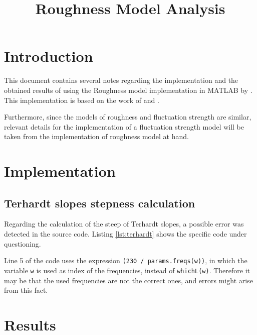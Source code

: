 \documentclass[a4paper]{article}
\begin{document}
\title{\citeauthor{Schrader2002Matlab} Roughness Model Analysis}

\maketitle

\section{Introduction} 

This document contains several notes regarding the implementation and the
obtained results of using the Roughness model implementation in MATLAB by
\citet{Schrader2002Matlab}. This implementation is based on the work of
\citet{Aures1985Ein} and \citet{Daniel1997Psychoacoustical}.

Furthermore, since the models of roughness and fluctuation strength are similar,
relevant details for the implementation of a fluctuation strength model will be
taken from the implementation of roughness model at hand.

\section{Implementation}

\subsection{Terhardt slopes stepness calculation}

Regarding the calculation of the steep of Terhardt slopes, a possible error was
detected in the source code. Listing \ref{lst:terhardt} shows the specific code
under questioning.



Line 5 of the code uses the expression
\lstinline[style=MATLAB-style]!(230 / params.freqs(w))!, in which the variable
\lstinline[style=MATLAB-style]!w! is used as index of the frequencies, instead
of \lstinline[style=MATLAB-style]!whichL(w)!. Therefore it may be that the used
frequencies are not the correct ones, and errors might arise from this fact.

\section{Results}
\end{document}

